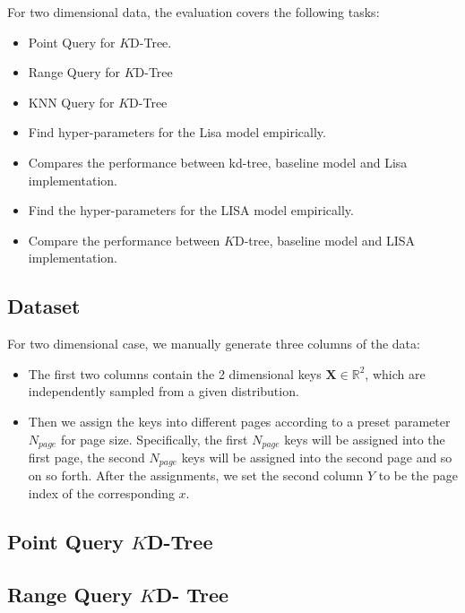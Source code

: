 For two dimensional data, the evaluation covers the following tasks:

\begin{itemize}
  \item Point Query for $K$D-Tree.
  \item Range Query for $K$D-Tree
  \item KNN Query for $K$D-Tree
	\item Find hyper-parameters for the Lisa model empirically.
	\item Compares the performance between kd-tree, baseline model and Lisa implementation.
	\item Find the hyper-parameters for the LISA model empirically.
	\item Compare the performance between $K$D-tree, baseline model and LISA implementation.
\end{itemize}

\subsection{Dataset}

For two dimensional case, we manually generate three columns of the data:

\begin{itemize}
	\item The first two columns contain the  2 dimensional keys $\boldsymbol{X} \in \mathbb{R}^{2}$, which are independently sampled from a given distribution. %
	\item Then we assign the keys into different pages according to a preset parameter $N_{page}$ for page size. Specifically, the first $N_{page}$ keys will be assigned into the first page, the second $N_{page}$ keys will be assigned into the second page and so on so forth. After the assignments, we set the second column $Y$ to be the page index of the corresponding $x$.
\end{itemize}

\subsection{Point Query $K$D-Tree}

\subsection{Range Query $K$D- Tree}

